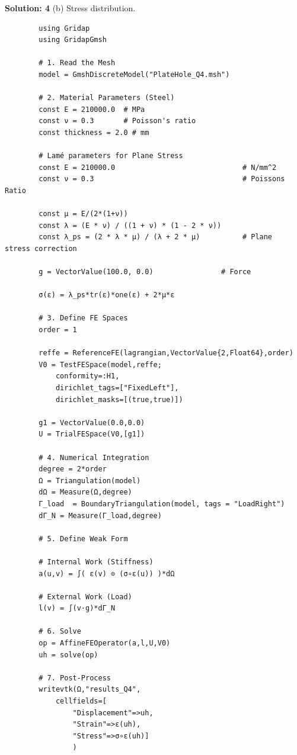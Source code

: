 \documentclass{homework}
\begin{document}
\begin{solution}
    \textbf{Solution: 4}
    (b)  Stress distribution. 
    \sloppy
    \begin{verbatim}
        using Gridap
        using GridapGmsh
        
        # 1. Read the Mesh
        model = GmshDiscreteModel("PlateHole_Q4.msh")
        
        # 2. Material Parameters (Steel)
        const E = 210000.0  # MPa
        const ν = 0.3       # Poisson's ratio
        const thickness = 2.0 # mm
        
        # Lamé parameters for Plane Stress
        const E = 210000.0                              # N/mm^2
        const ν = 0.3                                   # Poissons Ratio
        
        const μ = E/(2*(1+ν))
        const λ = (E * ν) / ((1 + ν) * (1 - 2 * ν))
        const λ_ps = (2 * λ * μ) / (λ + 2 * μ)          # Plane stress correction
        
        g = VectorValue(100.0, 0.0)                # Force
        
        σ(ε) = λ_ps*tr(ε)*one(ε) + 2*μ*ε
        
        # 3. Define FE Spaces
        order = 1
        
        reffe = ReferenceFE(lagrangian,VectorValue{2,Float64},order)
        V0 = TestFESpace(model,reffe;
            conformity=:H1,
            dirichlet_tags=["FixedLeft"],
            dirichlet_masks=[(true,true)])
          
        g1 = VectorValue(0.0,0.0)
        U = TrialFESpace(V0,[g1])
        
        # 4. Numerical Integration
        degree = 2*order
        Ω = Triangulation(model)
        dΩ = Measure(Ω,degree)
        Γ_load  = BoundaryTriangulation(model, tags = "LoadRight")
        dΓ_N = Measure(Γ_load,degree)
        
        # 5. Define Weak Form
        
        # Internal Work (Stiffness)
        a(u,v) = ∫( ε(v) ⊙ (σ∘ε(u)) )*dΩ 
        
        # External Work (Load)
        l(v) = ∫(v⋅g)*dΓ_N
        
        # 6. Solve
        op = AffineFEOperator(a,l,U,V0)
        uh = solve(op)
        
        # 7. Post-Process
        writevtk(Ω,"results_Q4",
            cellfields=[
                "Displacement"=>uh,
                "Strain"=>ε(uh),
                "Stress"=>σ∘ε(uh)]
                )


\end{verbatim}
\end{solution}
\end{document}
